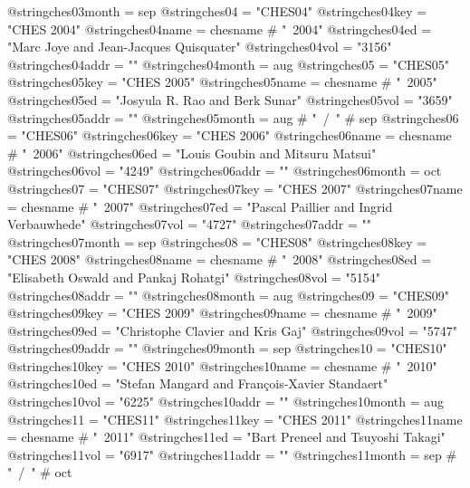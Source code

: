 @string{ches03month =           sep}
@string{ches04 =                "CHES04"}
@string{ches04key =             "CHES 2004"}
@string{ches04name =            chesname # "~2004"}
@string{ches04ed =              "Marc Joye and Jean-Jacques Quisquater"}
@string{ches04vol =             "3156"}
@string{ches04addr =            ""}
@string{ches04month =           aug}
@string{ches05 =                "CHES05"}
@string{ches05key =             "CHES 2005"}
@string{ches05name =            chesname # "~2005"}
@string{ches05ed =              "Josyula R. Rao and Berk Sunar"}
@string{ches05vol =             "3659"}
@string{ches05addr =            ""}
@string{ches05month =           aug # "~/~" # sep}
@string{ches06 =                "CHES06"}
@string{ches06key =             "CHES 2006"}
@string{ches06name =            chesname # "~2006"}
@string{ches06ed =              "Louis Goubin and Mitsuru Matsui"}
@string{ches06vol =             "4249"}
@string{ches06addr =            ""}
@string{ches06month =           oct}
@string{ches07 =                "CHES07"}
@string{ches07key =             "CHES 2007"}
@string{ches07name =            chesname # "~2007"}
@string{ches07ed =              "Pascal Paillier and Ingrid Verbauwhede"}
@string{ches07vol =             "4727"}
@string{ches07addr =            ""}
@string{ches07month =           sep}
@string{ches08 =                "CHES08"}
@string{ches08key =             "CHES 2008"}
@string{ches08name =            chesname # "~2008"}
@string{ches08ed =              "Elisabeth Oswald and Pankaj Rohatgi"}
@string{ches08vol =             "5154"}
@string{ches08addr =            ""}
@string{ches08month =           aug}
@string{ches09 =                "CHES09"}
@string{ches09key =             "CHES 2009"}
@string{ches09name =            chesname # "~2009"}
@string{ches09ed =              "Christophe Clavier and Kris Gaj"}
@string{ches09vol =             "5747"}
@string{ches09addr =            ""}
@string{ches09month =           sep}
@string{ches10 =                "CHES10"}
@string{ches10key =             "CHES 2010"}
@string{ches10name =            chesname # "~2010"}
@string{ches10ed =              "Stefan Mangard and Fran\c{c}ois-Xavier Standaert"}
@string{ches10vol =             "6225"}
@string{ches10addr =            ""}
@string{ches10month =           aug}
@string{ches11 =                "CHES11"}
@string{ches11key =             "CHES 2011"}
@string{ches11name =            chesname # "~2011"}
@string{ches11ed =              "Bart Preneel and Tsuyoshi Takagi"}
@string{ches11vol =             "6917"}
@string{ches11addr =            ""}
@string{ches11month =           sep # "~/~" # oct}
